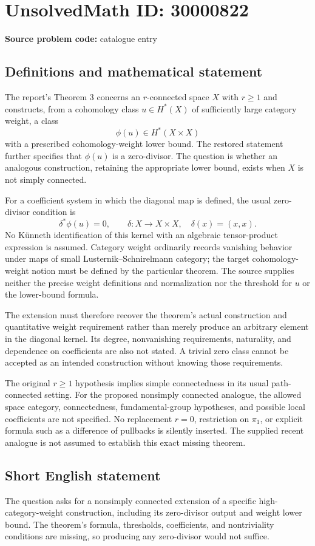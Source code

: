 \documentclass[11pt]{article}
\begin{document}
\section*{UnsolvedMath ID: 30000822}
\textbf{Source problem code:} catalogue entry
\subsection{Definitions and mathematical statement}
The report's Theorem 3 concerns an $r$-connected space $X$ with $r\ge1$ and constructs, from a cohomology class $u\in H^*(X)$ of sufficiently large category weight, a class
\[
 \phi(u)\in H^*(X\times X)
\]
with a prescribed cohomology-weight lower bound. The restored statement further specifies that $\phi(u)$ is a zero-divisor. The question is whether an analogous construction, retaining the appropriate lower bound, exists when $X$ is not simply connected.

For a coefficient system in which the diagonal map is defined, the usual zero-divisor condition is
\[
 \delta^*\phi(u)=0,\qquad \delta:X\longrightarrow X\times X,
 \quad\delta(x)=(x,x).
\]
No K\"unneth identification of this kernel with an algebraic tensor-product expression is assumed. Category weight ordinarily records vanishing behavior under maps of small Lusternik--Schnirelmann category; the target cohomology-weight notion must be defined by the particular theorem. The source supplies neither the precise weight definitions and normalization nor the threshold for $u$ or the lower-bound formula.

The extension must therefore recover the theorem's actual construction and quantitative weight requirement rather than merely produce an arbitrary element in the diagonal kernel. Its degree, nonvanishing requirements, naturality, and dependence on coefficients are also not stated. A trivial zero class cannot be accepted as an intended construction without knowing those requirements.

The original $r\ge1$ hypothesis implies simple connectedness in its usual path-connected setting. For the proposed nonsimply connected analogue, the allowed space category, connectedness, fundamental-group hypotheses, and possible local coefficients are not specified. No replacement $r=0$, restriction on $\pi_1$, or explicit formula such as a difference of pullbacks is silently inserted. The supplied recent analogue is not assumed to establish this exact missing theorem.
\subsection{Short English statement}
The question asks for a nonsimply connected extension of a specific high-category-weight construction, including its zero-divisor output and weight lower bound. The theorem's formula, thresholds, coefficients, and nontriviality conditions are missing, so producing any zero-divisor would not suffice.
\end{document}
